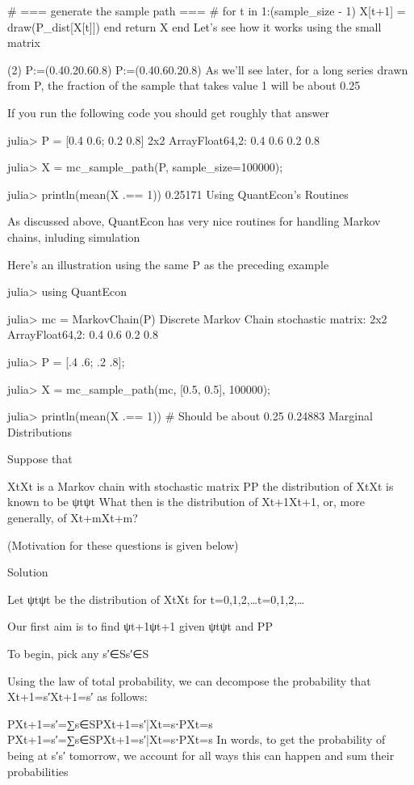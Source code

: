     # === generate the sample path === #
    for t in 1:(sample_size - 1)
        X[t+1] = draw(P_dist[X[t]])
    end
    return X
end
Let’s see how it works using the small matrix

(2)
P:=(0.40.20.60.8)
P:=(0.40.60.20.8)
As we’ll see later, for a long series drawn from P, the fraction of the sample that takes value 1 will be about 0.25

If you run the following code you should get roughly that answer

julia> P = [0.4 0.6; 0.2 0.8]
2x2 Array{Float64,2}:
 0.4  0.6
 0.2  0.8

julia> X = mc_sample_path(P, sample_size=100000);

julia> println(mean(X .== 1))
0.25171
Using QuantEcon’s Routines

As discussed above, QuantEcon has very nice routines for handling Markov chains, inluding simulation

Here’s an illustration using the same P as the preceding example

julia> using QuantEcon

julia> mc = MarkovChain(P)
Discrete Markov Chain
stochastic matrix:
2x2 Array{Float64,2}:
 0.4  0.6
 0.2  0.8

julia> P = [.4 .6; .2 .8];

julia> X = mc_sample_path(mc, [0.5, 0.5], 100000);

julia> println(mean(X .== 1))  # Should be about 0.25
0.24883
Marginal Distributions

Suppose that

{Xt}{Xt} is a Markov chain with stochastic matrix PP
the distribution of XtXt is known to be ψtψt
What then is the distribution of Xt+1Xt+1, or, more generally, of Xt+mXt+m?

(Motivation for these questions is given below)

Solution

Let ψtψt be the distribution of XtXt for t=0,1,2,…t=0,1,2,…

Our first aim is to find ψt+1ψt+1 given ψtψt and PP

To begin, pick any s′∈Ss′∈S

Using the law of total probability, we can decompose the probability that Xt+1=s′Xt+1=s′ as follows:

P{Xt+1=s′}=∑s∈SP{Xt+1=s′|Xt=s}⋅P{Xt=s}
P{Xt+1=s′}=∑s∈SP{Xt+1=s′|Xt=s}⋅P{Xt=s}
In words, to get the probability of being at s′s′ tomorrow, we account for all ways this can happen and sum their probabilities

